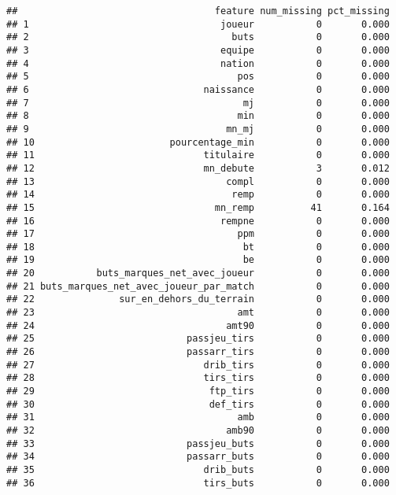 \documentclass[7pt,]{report}
\begin{document}
\begin{verbatim}
##                                   feature num_missing pct_missing
## 1                                  joueur           0       0.000
## 2                                    buts           0       0.000
## 3                                  equipe           0       0.000
## 4                                  nation           0       0.000
## 5                                     pos           0       0.000
## 6                               naissance           0       0.000
## 7                                      mj           0       0.000
## 8                                     min           0       0.000
## 9                                   mn_mj           0       0.000
## 10                        pourcentage_min           0       0.000
## 11                              titulaire           0       0.000
## 12                              mn_debute           3       0.012
## 13                                  compl           0       0.000
## 14                                   remp           0       0.000
## 15                                mn_remp          41       0.164
## 16                                 rempne           0       0.000
## 17                                    ppm           0       0.000
## 18                                     bt           0       0.000
## 19                                     be           0       0.000
## 20           buts_marques_net_avec_joueur           0       0.000
## 21 buts_marques_net_avec_joueur_par_match           0       0.000
## 22               sur_en_dehors_du_terrain           0       0.000
## 23                                    amt           0       0.000
## 24                                  amt90           0       0.000
## 25                           passjeu_tirs           0       0.000
## 26                           passarr_tirs           0       0.000
## 27                              drib_tirs           0       0.000
## 28                              tirs_tirs           0       0.000
## 29                               ftp_tirs           0       0.000
## 30                               def_tirs           0       0.000
## 31                                    amb           0       0.000
## 32                                  amb90           0       0.000
## 33                           passjeu_buts           0       0.000
## 34                           passarr_buts           0       0.000
## 35                              drib_buts           0       0.000
## 36                              tirs_buts           0       0.000

\end{verbatim}
\end{document}
